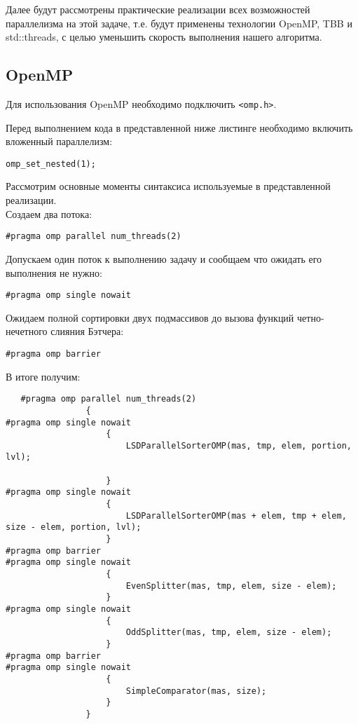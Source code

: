 \documentclass{article}
\begin{document}
\par Далее будут рассмотрены практические реализации всех возможностей параллелизма на этой задаче, т.е. будут применены технологии OpenMP, TBB и std::threads, с целью уменьшить скорость выполнения нашего алгоритма.

\subsection{OpenMP}
Для использования OpenMP необходимо подключить \verb|<omp.h>|.
\par Перед выполнением кода в представленной ниже листинге необходимо включить вложенный параллелизм:
\vspace{10pt}
\begin{lstlisting}
omp_set_nested(1);
\end{lstlisting}
\vspace{-25pt}
\par Рассмотрим основные моменты синтаксиса используемые в представленной реализации.\\
Создаем два потока:
\vspace{10pt}
\begin{lstlisting}
#pragma omp parallel num_threads(2)
\end{lstlisting}
\vspace{-25pt}
Допускаем один поток к выполнению задачу и сообщаем что ожидать его выполнения не нужно:
\vspace{10pt}
\begin{lstlisting}
#pragma omp single nowait
\end{lstlisting}
\vspace{-25pt}
Ожидаем полной сортировки двух подмассивов до вызова функций четно-нечетного слияния Бэтчера:
\vspace{10pt}
\begin{lstlisting}
#pragma omp barrier
\end{lstlisting}
\vspace{-25pt}

В итоге получим:
\vspace{10pt}
\begin{lstlisting}
   #pragma omp parallel num_threads(2)
                {
#pragma omp single nowait
                    {
                        LSDParallelSorterOMP(mas, tmp, elem, portion, lvl);

                    }
#pragma omp single nowait
                    {
                        LSDParallelSorterOMP(mas + elem, tmp + elem, size - elem, portion, lvl);
                    }
#pragma omp barrier
#pragma omp single nowait
                    {
                        EvenSplitter(mas, tmp, elem, size - elem);
                    }
#pragma omp single nowait
                    {
                        OddSplitter(mas, tmp, elem, size - elem);
                    }
#pragma omp barrier
#pragma omp single nowait
                    {
                        SimpleComparator(mas, size);
                    }
                }
\end{lstlisting}
\vspace{-25pt}
\end{document}
